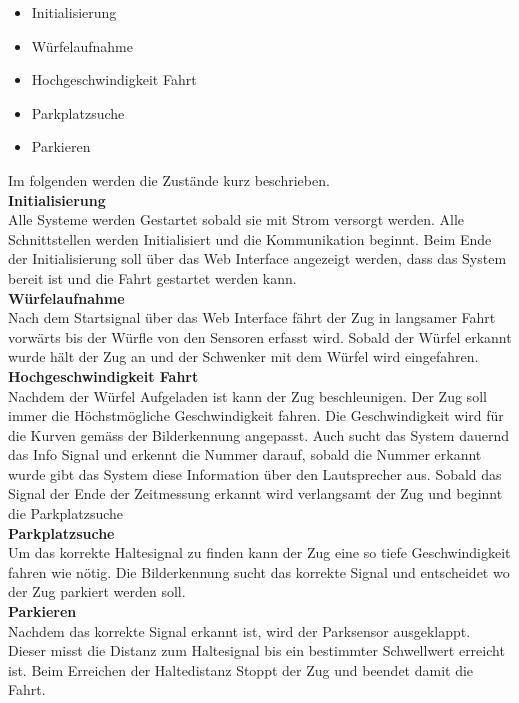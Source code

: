 \documentclass[../../main.tex]{subfiles}
\begin{document}
    \begin{itemize}
        \item Initialisierung
        \item Würfelaufnahme
        \item Hochgeschwindigkeit Fahrt
        \item Parkplatzsuche
        \item Parkieren
    \end{itemize}

    Im folgenden werden die Zustände kurz beschrieben.\\

    \textbf{Initialisierung}\\
    Alle Systeme werden Gestartet sobald sie mit Strom versorgt werden. Alle Schnittstellen werden Initialisiert und die Kommunikation beginnt. Beim Ende der Initialisierung soll über das Web Interface angezeigt werden, dass das System bereit ist und die Fahrt gestartet werden kann.\\

    \textbf{Würfelaufnahme}\\
    Nach dem Startsignal über das Web Interface fährt der Zug in langsamer Fahrt vorwärts bis der Würfle von den Sensoren erfasst wird. Sobald der Würfel erkannt wurde hält der Zug an und der Schwenker mit dem Würfel wird eingefahren.\\

    \textbf{Hochgeschwindigkeit Fahrt}\\
    Nachdem der Würfel Aufgeladen ist kann der Zug beschleunigen. Der Zug soll immer die Höchstmögliche Geschwindigkeit
    fahren. Die Geschwindigkeit wird für die Kurven gemäss der Bilderkennung angepasst. Auch sucht das System dauernd
    das Info Signal und erkennt die Nummer darauf, sobald die Nummer erkannt wurde gibt das System diese Information
    über den Lautsprecher aus.
    Sobald das Signal der Ende der Zeitmessung erkannt wird verlangsamt der Zug und beginnt die Parkplatzsuche\\

    \textbf{Parkplatzsuche}\\
    Um das korrekte Haltesignal zu finden kann der Zug eine so tiefe Geschwindigkeit fahren wie nötig. Die Bilderkennung sucht das korrekte Signal und entscheidet wo der Zug parkiert werden soll.\\

    \textbf{Parkieren}\\
    Nachdem das korrekte Signal erkannt ist, wird der Parksensor ausgeklappt. Dieser misst die Distanz zum Haltesignal bis ein bestimmter Schwellwert erreicht ist. Beim Erreichen der Haltedistanz Stoppt der Zug und beendet damit die Fahrt.

    
\end{document}
